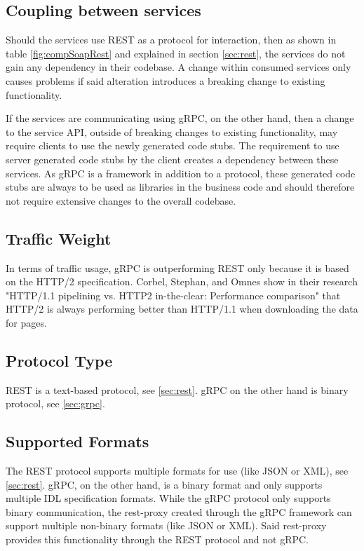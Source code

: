 \documentclass[conference]{IEEEtran}
\begin{document}
\subsection{Coupling between services}

Should the services use REST as a protocol for interaction, then as shown in table \ref{fig:compSoapRest} and explained in section \ref{sec:rest}, the services do not gain any dependency in their codebase. A change within consumed services only causes problems if said alteration introduces a breaking change to existing functionality.

If the services are communicating using gRPC, on the other hand, then a change to the service API, outside of breaking changes to existing functionality, may require clients to use the newly generated code stubs. The requirement to use server generated code stubs by the client creates a dependency between these services. As gRPC is a framework in addition to a protocol, these generated code stubs are always to be used as libraries in the business code and should therefore not require extensive changes to the overall codebase.

\subsection{Traffic Weight}

In terms of traffic usage, gRPC is outperforming REST only because it is based on the HTTP/2 specification. Corbel, Stephan, and Omnes show in their research "HTTP/1.1 pipelining vs. HTTP2 in-the-clear: Performance comparison" \cite{7745823} that HTTP/2 is always performing better than HTTP/1.1 when downloading the data for pages.

\subsection{Protocol Type}

REST is a text-based protocol, see \ref{sec:rest}. gRPC on the other hand is binary protocol, see \ref{sec:grpc}.

\subsection{Supported Formats}

The REST protocol supports multiple formats for use (like JSON or XML), see \ref{sec:rest}. gRPC, on the other hand, is a binary format and only supports multiple IDL specification formats. While the gRPC protocol only supports binary communication, the rest-proxy created through the gRPC framework can support multiple non-binary formats (like JSON or XML). Said rest-proxy provides this functionality through the REST protocol and not gRPC.
\end{document}
